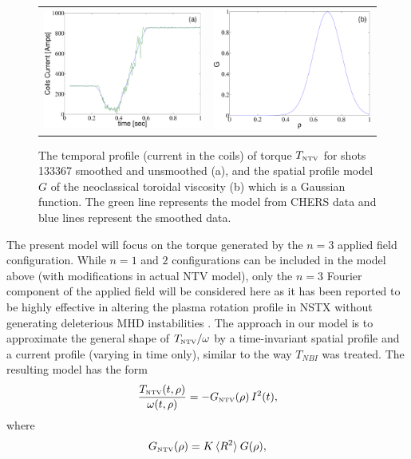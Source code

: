 \documentclass[12pt]{iopart}
\begin{document}
\begin{figure}
  \begin{tabular}{cc}
     \includegraphics[width=0.5\linewidth]{imene_figs/current} &
   \includegraphics[width=0.5\linewidth]{imene_figs/gauss1}
  \end{tabular} 
\caption{ The temporal profile (current  in the coils) of torque $T_\textrm{\tiny{NTV}}$ for shots 133367 smoothed and unsmoothed (a), and the  spatial profile model $G$ of the neoclassical toroidal viscosity (b)  which is a Gaussian function. The green line represents the model from CHERS data and  blue lines represent the smoothed data.}
  \label{fig:current}
\end{figure}
The present model  will focus on the torque generated by the $n=3$ applied field configuration.  While $n=1$ and $2$ configurations can be included in the model above (with modifications in actual NTV model), only the $n=3$  Fourier component of the applied field will be considered here as it has been reported to be highly effective in altering the plasma rotation profile in NSTX without generating deleterious MHD instabilities \cite{ Zhu06} .
The approach in our model is to approximate the general shape of $T_\textrm{\tiny{NTV}}/\omega$ by a time-invariant spatial profile and a current profile (varying in time only), similar to the way $T_{NBI}$ was treated. The resulting model has the form  
\begin{equation}
   \frac{T_\textrm{\tiny{NTV}}(t,\rho)}{\omega(t,\rho)} = - G_\textrm{\tiny NTV}  (\rho) \, I^2(t),
\end{equation}
where
\begin{equation}
G_\textrm{\tiny NTV}  (\rho) = K \,  \langle R^2 \rangle \:G(\rho),
\end{equation}
\end{document}
